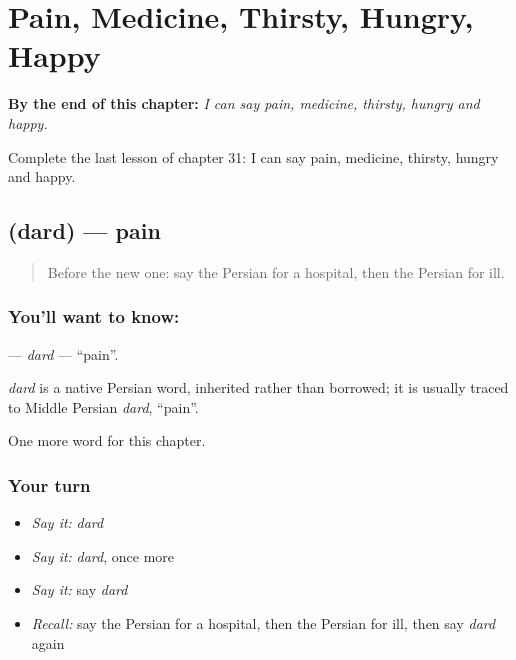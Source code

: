 
\chapter{Pain, Medicine, Thirsty, Hungry, Happy}
\label{ch:fa-pain-medicine-thirsty-hungry-happy}

\begin{chapteropening}
\textbf{By the end of this chapter:} \emph{I can say pain, medicine, thirsty, hungry and happy.}

Complete the last lesson of chapter 31: I can say pain, medicine, thirsty, hungry and happy.
\end{chapteropening}

\section[\texorpdfstring{\fa{درد} (dard)}{درد (dard)}]{ (dard) — pain}

\label{lesson:FA-C31-dard}



\begin{quote}
Before the new one: say the Persian for a hospital, then the Persian for ill.
\end{quote}

\subsection*{You'll want to know: }
\textbf{} — \emph{dard} — \textquotedblleft{}pain\textquotedblright{}.

\begin{cousinweb}
\emph{dard} is a native Persian word, inherited rather than borrowed; it is usually traced to Middle Persian \emph{dard}, \textquotedblleft{}pain\textquotedblright{}.
\end{cousinweb}

\begin{grammarlens}[title={What you've built}]
One more word for this chapter.
\end{grammarlens}

\subsection*{Your turn}
\begin{itemize}
\raggedright
  \item \emph{Say it:} \emph{dard}
  \item \emph{Say it:} \emph{dard}, once more
  \item \emph{Say it:} say \emph{dard}
  \item \emph{Recall:} say the Persian for a hospital, then the Persian for ill, then say \emph{dard} again
\end{itemize}

